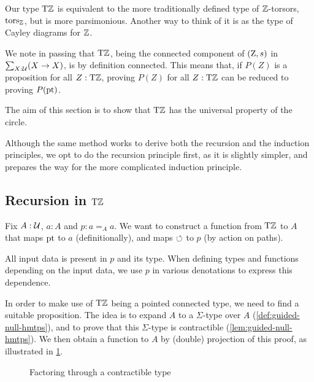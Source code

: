 \documentclass[a4,12pt]{amsart}
\begin{document}
Our type ${\mathrm{T}\mathbb{Z}}$ is equivalent to the more traditionally defined 
type of $\mathbb{Z}$-torsors, $\mathrm{tors}_{\mathbb{Z}}$, but is more parsimonious.
Another way to think of it is as the type of Cayley diagrams for $\mathbb{Z}$.

We note in passing that ${\mathrm{T}\mathbb{Z}}$, being the connected component of $(\mathrm{Z},s)$
in $\sum_{X:\mathcal{U}}(X\to X)$, is by definition connected. This means that,
if $P(Z)$ is a proposition for all $Z:{\mathrm{T}\mathbb{Z}}$, proving $P(Z)$ for all $Z:{\mathrm{T}\mathbb{Z}}$
can be reduced to proving $P({\mathord{\mathrm{pt}}})$.

The aim of this section is to show that ${\mathrm{T}\mathbb{Z}}$ has the
universal property of the circle.

Although the same method works to derive both the recursion and the induction principles,
we opt to do the recursion principle first, as it is slightly simpler,
and prepares the way for the more complicated induction principle.

\subsection{Recursion in ${\mathrm{T}\mathbb{Z}}$}\label{sec:TorZ-recursion}

Fix $A:\mathcal{U}$, $a:A$ and $p: a=_A a$.
We want to construct a function from ${\mathrm{T}\mathbb{Z}}$ to $A$ 
that maps ${\mathord{\mathrm{pt}}}$ to $a$ (definitionally),
and maps $\circlearrowleft$ to $p$ (by action on paths).

All input data is present in $p$ and its type.
When defining types and functions depending on the input data, 
we use $p$ in various denotations to express this dependence. 

In order to make use of ${\mathrm{T}\mathbb{Z}}$ being a pointed connected type, 
we need to find a suitable proposition.
The idea is to expand $A$ to a $\Sigma$-type over $A$
(\cref{def:guided-null-hmtps}), 
and to prove that this $\Sigma$-type is contractible
(\cref{lem:guided-null-hmtps}).
We then obtain a function to $A$ by (double) projection
of this proof, as illustrated in \cref{fig:TorZ-recursion}.

\begin{figure}
\caption{\label{fig:TorZ-recursion}Factoring through a contractible type}
\end{figure}
\end{document}
